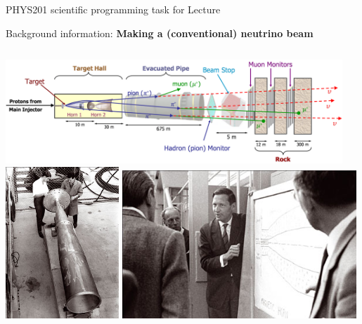
%
%

{
\programmingslide

%
%
%

\begin{frame}{PHYS201 scientific programming task for Lecture \thislecture}

  Background information: {\bf Making a (conventional) neutrino beam}\\

  \begin{columns}
    \begin{column}{0.78\textwidth}
      \centering
      \includegraphics[width=0.95\textwidth]{./images/schematics/numi.png}\\
      \vspace{0.2cm}
      \includegraphics[width=0.32\textwidth]{./images/photos/beam_horn_old_1.jpg}
      \hfill
      \includegraphics[width=0.66\textwidth]{./images/photos/beam_horn_old_3.jpg}

\end{column}
\end{columns}
\end{frame}}
